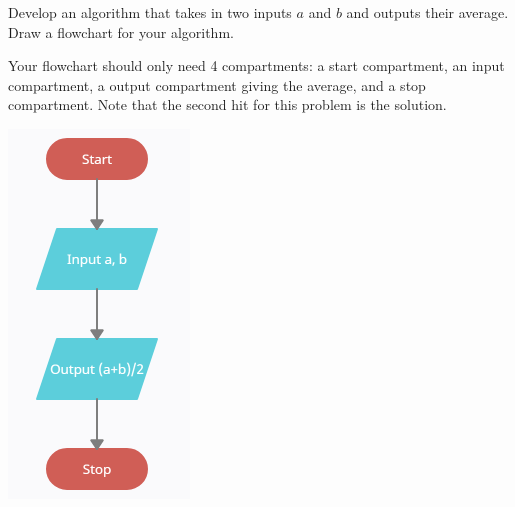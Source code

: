\documentclass{ximera}
\begin{document}
\begin{question} 
	Develop an algorithm that takes in two inputs $a$ and $b$ and outputs their average. Draw a flowchart for your algorithm.
	\begin{hint}
		Your flowchart should only need 4 compartments: a start compartment, an input compartment, a output compartment giving the average, and a stop compartment. Note that the second hit for this problem is the solution.
	\end{hint}
	\begin{hint}
		\begin{center}
		\includegraphics{average.png}
		\end{center}
	\end{hint}
\end{question}
	
\end{document}
